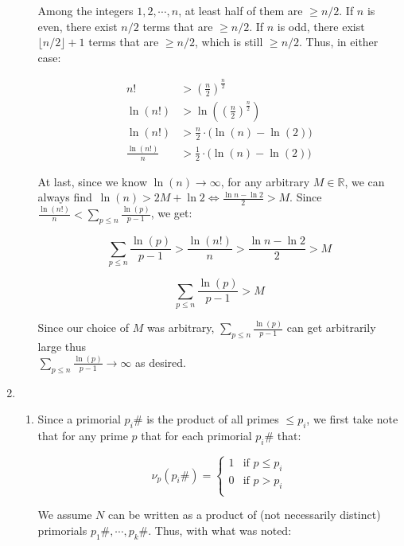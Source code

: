 \documentclass{article}
\begin{document}
\begin{enumerate}[leftmargin=*, label=\arabic*.]
\begin{enumerate}[label=\alph*)]
    Among the integers $1, 2, \cdots, n$, at least half of them are $\geq n/2$. If $n$ is even, there exist $n/2$ terms that are $\geq n/2$. If $n$ is odd, there exist $\lfloor n/2 \rfloor + 1$ terms that are $\geq n/2$, which is still $\geq n/2$. Thus, in either case: 
    
    \begin{align*}
        n! &> \left(\frac{n}{2}\right)^{\frac{n}{2}}\\
        \ln(n!) &> \ln\!\left(\left(\frac{n}{2}\right)^{\frac{n}{2}}\right) \\
        \ln(n!) &> \frac{n}{2} \cdot \bigl(\ln(n) - \ln(2)\bigr) \\
        \frac{\ln(n!)}{n} &> \frac{1}{2} \cdot \bigl(\ln(n) - \ln(2)\bigr)
    \end{align*}
    
    At last, since we know $\ln(n) \to \infty$, for any arbitrary $M \in \mathbb{R}$, we can always find $\,\ln(n) > 2M + \ln 2 \iff \frac{\ln n - \ln 2}{2} > M$. Since $\frac{\ln(n!)}{n} < \sum_{p \leq n} \frac{\ln(p)}{p - 1}$, we get: 
    
    \[
    \sum_{p \leq n} \frac{\ln(p)}{p - 1} > \frac{\ln(n!)}{n} > \frac{\ln n - \ln 2}{2} > M
    \]
    
    \[
    \sum_{p \leq n} \frac{\ln(p)}{p - 1} > M
    \]
    
    Since our choice of $M$ was arbitrary, $\sum_{p \leq n} \frac{\ln(p)}{p - 1}$ can get arbitrarily large thus \\ $\sum_{p \leq n} \frac{\ln(p)}{p - 1} \rightarrow \infty$ as desired.

    \end{enumerate}
    \newpage

    \item
    \begin{enumerate}[label=\alph*)]
    \item 

    Since a primorial $p_i\#$ is the product of all primes $\leq p_i$, we first take note that for any prime $p$ that for each primorial $p_i\#$ that: 

    \[
    \nu_p(p_i\#) =
    \begin{cases}
      1 & \text{if } p \leq p_i \\
      0 & \text{if } p > p_i \\
    \end{cases}
    \]
    
    We assume \(N\) can be written as a product of (not necessarily distinct) primorials \(p_1\#, \cdots, p_k\#\). Thus, with what was noted: 


\end{enumerate}
\end{enumerate}
\end{document}
